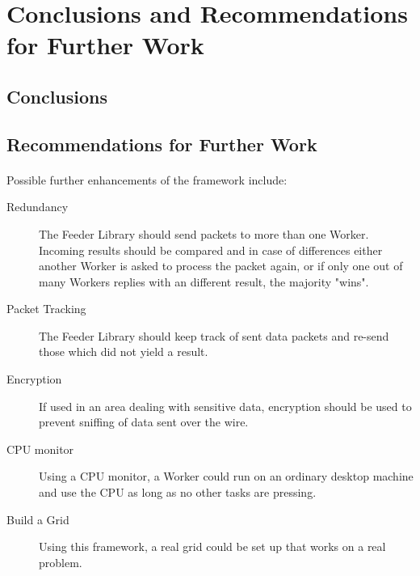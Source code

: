 \section{Conclusions and Recommendations for Further Work}
\paragraph{}

\subsection{Conclusions}
\paragraph{}



\subsection{Recommendations for Further Work}
\paragraph{}
Possible further enhancements of the framework include:
\begin{description}
\item[Redundancy] The Feeder Library should send packets to more than one Worker. Incoming results should be compared and in case of differences either another Worker is asked to process the packet again, or if only one out of many Workers replies with an different result, the majority "wins".
\item[Packet Tracking] The Feeder Library should keep track of sent data packets and re-send those which did not yield a result.
\item[Encryption] If used in an area dealing with sensitive data, encryption should be used to prevent sniffing of data sent over the wire.
\item[CPU monitor] Using a CPU monitor, a Worker could run on an ordinary desktop machine and use the CPU as long as no other tasks are pressing.
\item[Build a Grid] Using this framework, a real grid could be set up that works on a real problem.
\end{description}
